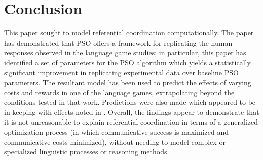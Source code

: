 \documentclass[a4paper,11pt]{article}
\begin{document}
\section{Conclusion}
This paper sought to model referential coordination computationally. The paper has demonstrated that PSO offers a framework for replicating the human responses observed in the \citeauthor{rohde2012} language game studies; in particular, this paper has identified a set of parameters for the PSO algorithm which yields a statistically significant improvement in replicating experimental data over baseline PSO parameters. The resultant model has been used to predict the effects of varying costs and rewards in one of the \citeauthor{rohde2012} language games, extrapolating beyond the conditions tested in that work. Predictions were also made which appeared to be in keeping with effects noted in \citeauthor{brennan1996}. Overall, the findings appear to demonstrate that it is not unreasonable to explain referential coordination in terms of a generalized optimization process (in which communicative success is maximized and communicative costs minimized), without needing to model complex or specialized linguistic processes or reasoning methods.







\end{document}
